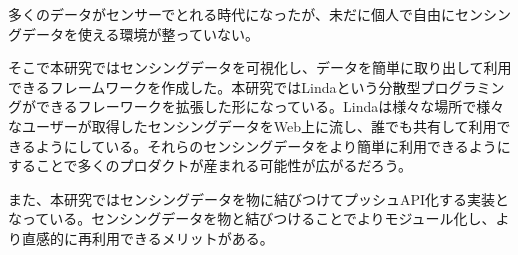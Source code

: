 


\begin{jabstract}
多くのデータがセンサーでとれる時代になったが、未だに個人で自由にセンシングデータを使える環境が整っていない。

そこで本研究ではセンシングデータを可視化し、データを簡単に取り出して利用できるフレームワークを作成した。本研究ではLindaという分散型プログラミングができるフレーワークを拡張した形になっている。Lindaは様々な場所で様々なユーザーが取得したセンシングデータをWeb上に流し、誰でも共有して利用できるようにしている。それらのセンシングデータをより簡単に利用できるようにすることで多くのプロダクトが産まれる可能性が広がるだろう。

また、本研究ではセンシングデータを物に結びつけてプッシュAPI化する実装となっている。センシングデータを物と結びつけることでよりモジュール化し、より直感的に再利用できるメリットがある。

\end{jabstract}



